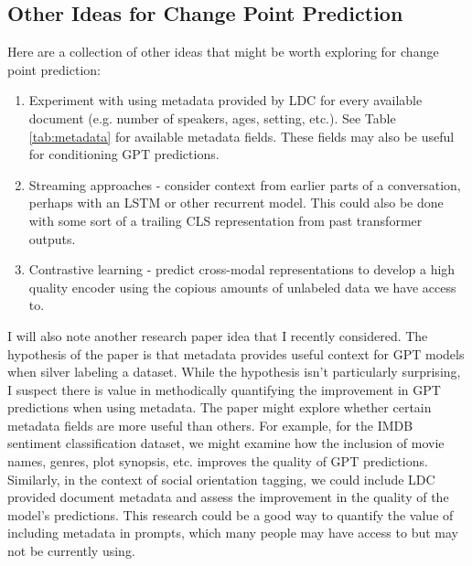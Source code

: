 \documentclass[12pt]{article}
\begin{document}
\subsection{Other Ideas for Change Point Prediction}
Here are a collection of other ideas that might be worth exploring for change point prediction:
\begin{enumerate}
    \item Experiment with using metadata provided by LDC for every available document (e.g. number of speakers, ages, setting, etc.). See Table \ref{tab:metadata} for available metadata fields. These fields may also be useful for conditioning GPT predictions.
    \item Streaming approaches - consider context from earlier parts of a conversation, perhaps with an LSTM or other recurrent model. This could also be done with some sort of a trailing CLS representation from past transformer outputs.
    \item Contrastive learning - predict cross-modal representations to develop a high quality encoder using the copious amounts of unlabeled data we have access to.
\end{enumerate}

I will also note another research paper idea that I recently considered. The hypothesis of the paper is that metadata provides useful context for GPT models when silver labeling a dataset. While the hypothesis isn't particularly surprising, I suspect there is value in methodically quantifying the improvement in GPT predictions when using metadata. The paper might explore whether certain metadata fields are more useful than others. For example, for the IMDB sentiment classification dataset, we might examine how the inclusion of movie names, genres, plot synopsis, etc. improves the quality of GPT predictions. Similarly, in the context of social orientation tagging, we could include LDC provided document metadata and assess the improvement in the quality of the model's predictions. This research could be a good way to quantify the value of including metadata in prompts, which many people may have access to but may not be currently using.
\end{document}
